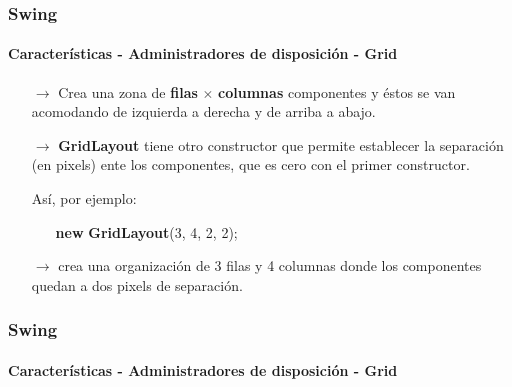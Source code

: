 \documentclass{beamer}
\begin{document}
	\begin{frame}
		\frametitle{Swing}
		\framesubtitle{Caracter\'isticas - Administradores de disposici\'on - Grid}

	    \begin{itemize}
		    \item[$\rightarrow$] Crea una zona de \textbf{filas} $\times$ \textbf{columnas} componentes y \'estos se van acomodando de izquierda a derecha y de arriba a abajo. 
		    \item[$\rightarrow$] \textbf{GridLayout} tiene otro constructor que permite establecer la separaci\'on (en pixels) ente los componentes, que es cero con el primer constructor.
		    \item[] As\'i, por ejemplo:
            	    \begin{itemize}
		    		    \item[] \textbf{new} \textbf{GridLayout}(3, 4, 2, 2);
		    	    \end{itemize}
		    \item[$\rightarrow$] crea una organizaci\'on de 3 filas y 4 columnas donde los componentes quedan a dos pixels de separaci\'on.
        \end{itemize}
	\end{frame}		
	
	\begin{frame}
		\frametitle{Swing}
		\framesubtitle{Caracter\'isticas - Administradores de disposici\'on - Grid}

	    \begin{center}
	    \end{center}
	\end{frame}		
	
\end{document}
